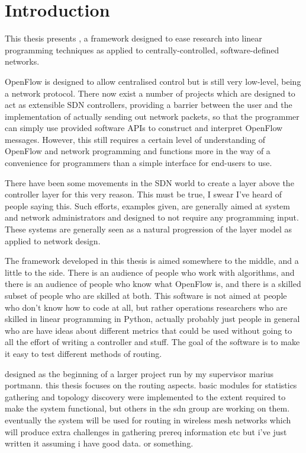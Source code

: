 \chapter{Introduction}

This thesis presents \thesis{}, a framework designed to ease research into linear programming techniques as applied to centrally-controlled, software-defined networks.

OpenFlow is designed to allow centralised control but is still very low-level, being a network protocol. There now exist a number of projects which are designed to act as extensible SDN controllers, providing a barrier between the user and the implementation of actually sending out network packets, so that the programmer can simply use provided software APIs to construct and interpret OpenFlow messages. However, this still requires a certain level of understanding of OpenFlow and network programming and functions more in the way of a convenience for programmers than a simple interface for end-users to use.

There have been some movements in the SDN world to create a layer above the controller layer for this very reason. This must be true, I swear I've heard of people saying this. Such efforts, examples given, are generally aimed at system and network administrators and designed to not require any programming input. These systems are generally seen as a natural progression of the layer model as applied to network design.

The framework developed in this thesis is aimed somewhere to the middle, and a little to the side. There is an audience of people who work with algorithms, and there is an audience of people who know what OpenFlow is, and there is a skilled subset of people who are skilled at both. This software is not aimed at people who don't know how to code at all, but rather operations researchers who are skilled in linear programming in Python, actually probably just people in general who are have ideas about different metrics that could be used without going to all the effort of writing a controller and stuff. The goal of the software is to make it easy to test different methods of routing. 

designed as the beginning of a larger project run by my supervisor marius portmann. this thesis focuses on the routing aspects. basic modules for statistics gathering and topology discovery were implemented to the extent required to make the system functional, but others in the sdn group are working on them. eventually the system will be used for routing in wireless mesh networks which will produce extra challenges in gathering prereq information etc but i've just written it assuming i have good data. or something.

